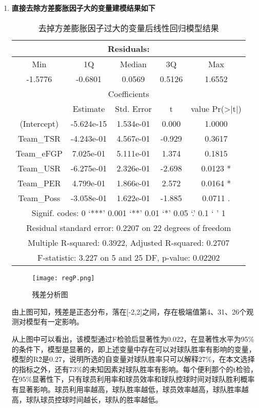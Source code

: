 \begin{enumerate}
	\item {\bfseries 直接去除方差膨胀因子大的变量建模结果如下}
	\begin{table}[h!]
		\begin{tabular}{|c|c|c|c|c|}
			\hline
			\multicolumn{5}{|c|}{ Residuals:} \\
			\hline
			Min  &    1Q&  Median  &    3Q    & Max \\
			-1.5776& -0.6801  &0.0569  &0.5126 & 1.6552 \\
			\hline
			\multicolumn{5}{|c|}{Coefficients}\\
			\hline
			&  Estimate& Std. Error& t &value Pr(>|t|)\\  
			(Intercept) &-5.624e-15  &1.534e-01 &  0.000  & 1.0000  \\
			Team\_TSR  &  -4.243e-01 & 4.567e-01 & -0.929&   0.3617  \\
			Team\_eFGP  &  7.025e-01 & 5.111e-01 &  1.374   &0.1815  \\
			Team\_USR   & -6.275e-01 & 2.326e-01&  -2.698&   0.0123 *\\
			Team\_PER  &   4.799e-01 & 1.866e-01  & 2.572   &0.0164 *\\
			Team\_Poss  & -3.058e-01&  1.622e-01 & -1.885  & 0.0711 .\\
			\hline
			\multicolumn{5}{|c|}{Signif. codes:  0 ‘***’ 0.001 ‘**’ 0.01 ‘*’ 0.05 ‘.’ 0.1 ‘ ’ 1}\\
			\hline
			\multicolumn{5}{|c|}{Residual standard error: 0.2207 on 22 degrees of freedom}\\
			\hline 
			\multicolumn{5}{|c|}{Multiple R-squared:  0.3922,	Adjusted R-squared:  0.2707 }\\
			\hline
			\multicolumn{5}{|c|}{F-statistic: 3.227 on 5 and 25 DF,  p-value: 0.02202}\\
			\hline
		\end{tabular}
		\centering
		\label{tab:10}
		\caption{去掉方差膨胀因子过大的变量后线性回归模型结果}
	\end{table}
	
		\begin{figure}[h!]
		\texttt{[image: regP.png]}
		\centering
		\caption{残差分析图}
		\label{fig:17}
	\end{figure}
	由上图可知，残差是正态分布，落在[-2,2]之间，存在极端值第4、31、26个观测对模型有一定影响。
	
	从上图中可以看出，该模型通过F检验后显著性为0.022，在显著性水平为95\%的条件下，模型是显著的，即上述变量中存在可以对球队胜率有影响的变量，模型的R\^2是0.27，说明所选的自变量对球队胜率只可以解释27\%，在本文选择的指标之外，还有73\%的未知因素对球队胜率有影响。每个便利那个的t检验，在95\%显著性下，只有球员利用率和球员效率和球队控球时间对球队胜利概率有显著影响。球员利用率越高，球队胜率越低，球员效率越高，球队胜率越高，球队球员控球时间越长，球队的胜率越低。\\
	

\end{enumerate}
